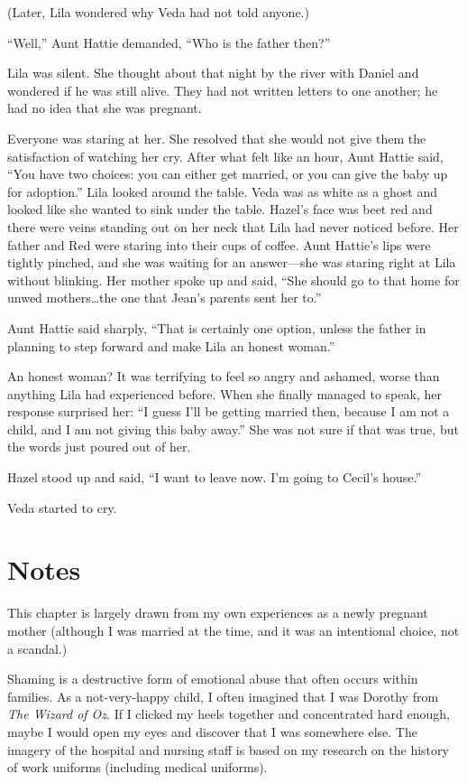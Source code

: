 \documentclass[
  letterpaper,
]{book}
\begin{document}
(Later, Lila wondered why Veda had not told anyone.)

``Well,'' Aunt Hattie demanded, ``Who is the father then?''

Lila was silent. She thought about that night by the river with Daniel
and wondered if he was still alive. They had not written letters to one
another; he had no idea that she was pregnant.

Everyone was staring at her. She resolved that she would not give them
the satisfaction of watching her cry. After what felt like an hour, Aunt
Hattie said, ``You have two choices: you can either get married, or you
can give the baby up for adoption.'' Lila looked around the table. Veda
was as white as a ghost and looked like she wanted to sink under the
table. Hazel's face was beet red and there were veins standing out on
her neck that Lila had never noticed before. Her father and Red were
staring into their cups of coffee. Aunt Hattie's lips were tightly
pinched, and she was waiting for an answer---she was staring right at
Lila without blinking. Her mother spoke up and said, ``She should go to
that home for unwed mothers\ldots the one that Jean's parents sent her
to.''

Aunt Hattie said sharply, ``That is certainly one option, unless the
father in planning to step forward and make Lila an honest woman.''

An honest woman? It was terrifying to feel so angry and ashamed, worse
than anything Lila had experienced before. When she finally managed to
speak, her response surprised her: ``I guess I'll be getting married
then, because I am not a child, and I am not giving this baby away.''
She was not sure if that was true, but the words just poured out of her.

Hazel stood up and said, ``I want to leave now. I'm going to Cecil's
house.''

Veda started to cry.

\section{Notes}\label{notes-32}

This chapter is largely drawn from my own experiences as a newly
pregnant mother (although I was married at the time, and it was an
intentional choice, not a scandal.)

Shaming is a destructive form of emotional abuse that often occurs
within families. As a not-very-happy child, I often imagined that I was
Dorothy from \emph{The Wizard of Oz}. If I clicked my heels together and
concentrated hard enough, maybe I would open my eyes and discover that I
was somewhere else. The imagery of the hospital and nursing staff is
based on my research on the history of work uniforms (including medical
uniforms).
\end{document}
